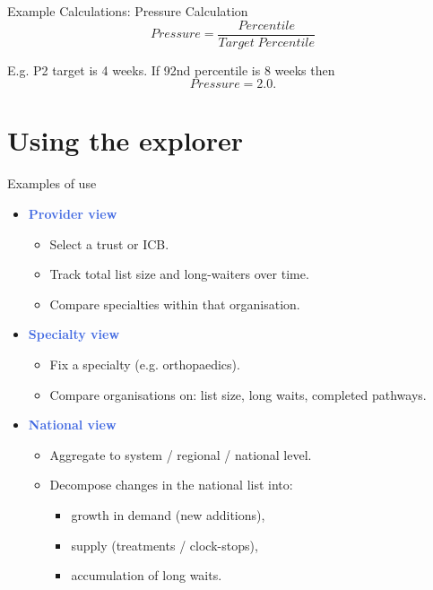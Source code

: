 \documentclass{beamer}
\let\oldtextbf\textbf
\renewcommand{\textbf}[1]{\textcolor{RoyalBlue}{\oldtextbf{#1}}}
\begin{document}
\begin{frame}{Example Calculations: Pressure Calculation}
 \[
Pressure = \frac{Percentile}{Target\; Percentile}
 \]

\vspace{3em}
E.g. P2 target is 4 weeks. If 92nd percentile is 8 weeks then 
\[
Pressure = 2.0.
\]

\end{frame}

\section{Using the explorer}

\begin{frame}{Examples of use}
  \begin{itemize}
    \item \textbf{Provider view}
      \begin{itemize}
        \item Select a trust or ICB.
        \item Track total list size and long-waiters over time.
        \item Compare specialties within that organisation.
      \end{itemize}
    \item \textbf{Specialty view}
      \begin{itemize}
        \item Fix a specialty (e.g. orthopaedics).
        \item Compare organisations on: list size, {long waits},
          completed pathways.
      \end{itemize}
    \item \textbf{National view}
      \begin{itemize}
        \item Aggregate to system / regional / national level.
        \item Decompose changes in the national list into:
          \begin{itemize}
            \item growth in demand (new additions),
            \item supply (treatments / clock-stops),
            \item accumulation of {long waits}.
          \end{itemize}
      \end{itemize}
  \end{itemize}
\end{frame}
\end{document}
